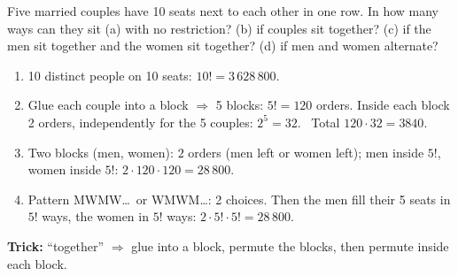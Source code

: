 
\begin{problem}
	Five married couples have 10 seats next to each other in one row. In how
	many ways can they sit (a) with no restriction? (b) if couples sit
	together? (c) if the men sit together and the women sit together? (d) if
	men and women alternate?
\end{problem}

\begin{slides}
	\small
	\exstatement
	\pause
	\sol
	\begin{enumerate}\setlength{\itemsep}{0pt}
		\item[(a)] 10 distinct people on 10 seats: $10! = 3\,628\,800$.
		\item[(b)] Glue each couple into a block $\Rightarrow$ 5 blocks:
		      $5!=120$ orders. Inside each block 2 orders, independently for the
		      5 couples: $2^5=32$. \ Total $120\cdot 32 = 3840$.
		\item[(c)] Two blocks (men, women): $2$ orders (men left or women
		      left); men inside $5!$, women inside $5!$:
		      $2\cdot 120\cdot 120 = 28\,800$.
		\item[(d)] Pattern MWMW\ldots\ or WMWM\ldots: 2 choices. Then the men
		      fill their 5 seats in $5!$ ways, the women in $5!$ ways:
		      $2\cdot 5!\cdot 5! = 28\,800$.
	\end{enumerate}
	\textbf{Trick:} ``together'' $\Rightarrow$ glue into a block, permute the
	blocks, then permute inside each block.
\end{slides}

